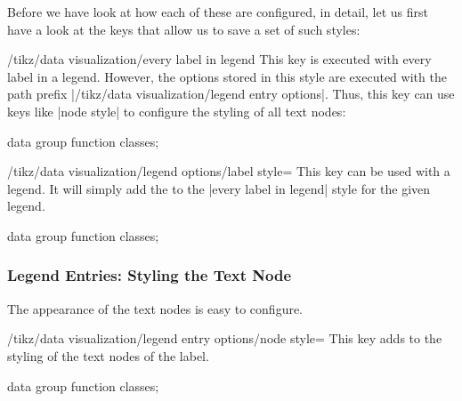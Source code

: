 Before we have look at how each of these are configured, in detail, let us
first have a look at the keys that allow us to save a set of such styles:

\begin{stylekey}{/tikz/data visualization/every label in legend}
    This key is executed with every label in a legend. However, the options
    stored in this style are executed with the path prefix
    |/tikz/data visualization/legend entry options|. Thus, this key can use
    keys like |node style| to configure the styling of all text nodes:
\begin{codeexample}[width=8cm]
\tikz \datavisualization [
  scientific axes,
  every label in legend/.style={node style=
    {fill=red!30}},
  visualize as smooth line/.list=
    {log, lin, squared, exp},
  legend=north east outside,
  log=    {label in legend={text=$\log x$}},
  lin=    {label in legend={text=$x/2$,
      node style={circle, draw=red}}},
  squared={label in legend={text=$x^2$}},
  exp=    {label in legend={text=$e^x$}},
  style sheet=strong colors]
data group {function classes};
\end{codeexample}
\end{stylekey}

\begin{key}{/tikz/data visualization/legend options/label style=}
    This key can be used with a legend. It will simply add the 
    to the |every label in legend| style for the given legend.
\begin{codeexample}[width=8cm]
\tikz \datavisualization [
  scientific axes,
  visualize as smooth line/.list=
    {log, lin, squared, exp},
  legend={label style={node style=draw}},
  log=    {label in legend={text=$\log x$}},
  lin=    {label in legend={text=$x/2$,
      node style={circle, draw=red}}},
  squared={label in legend={text=$x^2$}},
  exp=    {label in legend={text=$e^x$}},
  style sheet=strong colors]
data group {function classes};
\end{codeexample}
\end{key}


\subsubsection{Legend Entries: Styling the Text Node}

The appearance of the text nodes is easy to configure.

\begin{key}{/tikz/data visualization/legend entry options/node style=}
    This key adds  to the styling of the text nodes of the label.
\begin{codeexample}[width=8cm]
\tikz \datavisualization [
  scientific axes,
  visualize as smooth line/.list=
    {log, lin, squared, exp},
  legend=north east outside,
  log=    {label in legend={text=$\log x$}},
  lin=    {label in legend={text=$x/2$,
      node style={circle, draw=red}}},
  squared={label in legend={text=$x^2$}},
  exp=    {label in legend={text=$e^x$}},
  style sheet=strong colors]
data group {function classes};
\end{codeexample}
\end{key}

